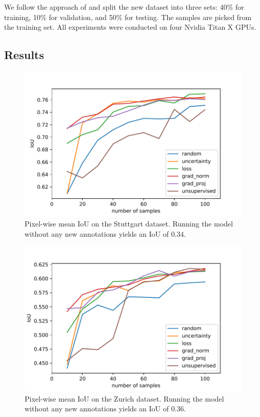 We follow the approach of \cite{milioto2018real} and split the new dataset into three sets: 40\% for training, 10\% for validation, and 50\% for testing. The samples are picked from the training set. All experiments were conducted on four Nvidia Titan X GPUs.  

\subsection{Results}


    \begin{figure}
    \centering
    \includegraphics[width=\linewidth]{pics/pw_iou_stuttgart_rev.pdf}
   		\caption{Pixel-wise mean IoU on the Stuttgart dataset. Running the model without any new annotations yields an IoU of $0.34$.}
		\label{fig:iou_stuttgart}    		
   \end{figure}
   
    \begin{figure}
    \centering
    \includegraphics[width=\linewidth]{pics/pw_iou_zurich_rev.pdf}
   		\caption{Pixel-wise mean IoU on the Zurich dataset. Running the model without any new annotations yields an IoU of $0.36$.}
		\label{fig:iou_zurich}    		
   \end{figure}
   


